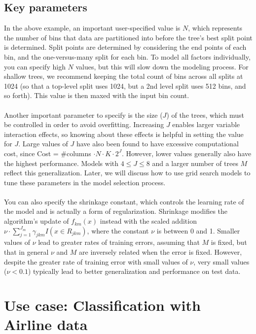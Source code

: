 {\subsection{Key parameters}

In the above example, an important user-specified value is $N$, which represents the number of bins that data are partitioned into before the tree's best split point is determined. Split points are determined by considering the end points of each bin, and the one-versus-many split for each bin. To model all factors individually, you can specify high $N$ values, but this will slow down the modeling process. For shallow trees, we recommend keeping the total count of bins across all splits at 1024 (so that a top-level split uses 1024, but a 2nd level split uses 512 bins, and so forth). This value is then maxed with the input bin count.
\\
\\
Another important parameter to specify is the size ($J$) of the trees, which must be controlled in order to avoid overfitting. Increasing $J$ enables larger variable interaction effects, so knowing about these effects is helpful in setting the value for $J$. Large values of $J$ have also been found to have excessive computational cost, since Cost = \#columns $\cdot N \cdot K \cdot 2^{J}$. However, lower values generally also have the highest performance. Models with $4 \leq J \leq 8$ and a larger number of trees $M$ reflect this generalization. Later, we will discuss how to use grid search models to tune these parameters in the model selection process.
\\
\\
You can also specify the shrinkage constant, which controls the learning rate of the model and is actually a form of regularization. Shrinkage modifies the algorithm's update of $f_{km}(x)$ instead with the scaled addition $\nu \cdot \sum_{j=1}^{J_m} \gamma_{jkm} I(x \in R_{jkm})$, where the constant $\nu$ is between 0 and 1. Smaller values of $\nu$ lead to greater rates of training errors, assuming that $M$ is fixed, but that in general $\nu$ and $M$ are inversely related when the error is  fixed.
However, despite the greater rate of training error with small values of $\nu$, very small values ($\nu < 0.1$) typically lead to better generalization and performance on test data. 

\section{Use case: Classification with Airline data} 

}

